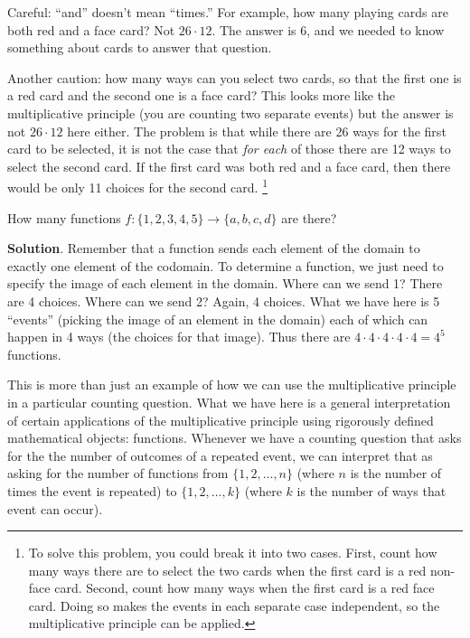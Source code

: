 \documentclass[11pt,]{book}
\theoremstyle{ptxplainnotitle}
\theoremstyle{ptxplaintitle}
\theoremstyle{ptxdefinitionnotitle}
\theoremstyle{ptxdefinitiontitle}
\theoremstyle{ptxdefinitionnotitle}
\theoremstyle{ptxdefinitiontitle}
\theoremstyle{ptxdefinitionnotitle}
\theoremstyle{ptxdefinitiontitle}
\theoremstyle{ptxdefinitiontitlenonumber}
\theoremstyle{ptxdefinitiontitlenonumber}
\numberwithin{equation}{chapter}
\begin{document}
\hypertarget{p-983}{}%
Careful: ``and'' doesn't mean ``times.'' For example, how many playing cards are both red and a face card? Not \(26 \cdot 12\). The answer is 6, and we needed to know something about cards to answer that question.%
\par
\hypertarget{p-984}{}%
Another caution: how many ways can you select two cards, so that the first one is a red card and the second one is a face card? This looks more like the multiplicative principle (you are counting two separate events) but the answer is not \(26 \cdot 12\) here either. The problem is that while there are 26 ways for the first card to be selected, it is not the case that \emph{for each} of those there are 12 ways to select the second card. If the first card was both red and a face card, then there would be only 11 choices for the second card. \footnote{To solve this problem, you could break it into two cases. First, count how many ways there are to select the two cards when the first card is a red non-face card. Second, count how many ways when the first card is a red face card. Doing so makes the events in each separate case independent, so the multiplicative principle can be applied.\label{fn-5}}%
\begin{example}\label{example-counting-functions-all}
\hypertarget{p-985}{}%
How many functions \(f:\{1,2,3,4,5\} \to \{a,b,c,d\}\) are there?%
\par\smallskip%
\noindent\textbf{Solution}.\hypertarget{solution-128}{}\quad%
\hypertarget{p-986}{}%
Remember that a function sends each element of the domain to exactly one element of the codomain.  To determine a function, we just need to specify the image of each element in the domain.  Where can we send 1?  There are 4 choices.  Where can we send 2?  Again, 4 choices.  What we have here is 5 ``events'' (picking the image of an element in the domain) each of which can happen in 4 ways (the choices for that image).  Thus there are \(4 \cdot 4 \cdot 4 \cdot 4 \cdot 4 = 4^5\) functions.%
\par
\hypertarget{p-987}{}%
This is more than just an example of how we can use the multiplicative principle in a particular counting question.  What we have here is a general interpretation of certain applications of the multiplicative principle using rigorously defined mathematical objects: functions.  Whenever we have a counting question that asks for the the number of outcomes of a repeated event, we can interpret that as asking for the number of functions from \(\{1,2,\ldots, n\}\) (where \(n\) is the number of times the event is repeated) to  \(\{1,2,\ldots,k\}\) (where \(k\) is the number of ways that event can occur).%
\end{example}
\typeout{************************************************}
\typeout{************************************************}
\end{document}
